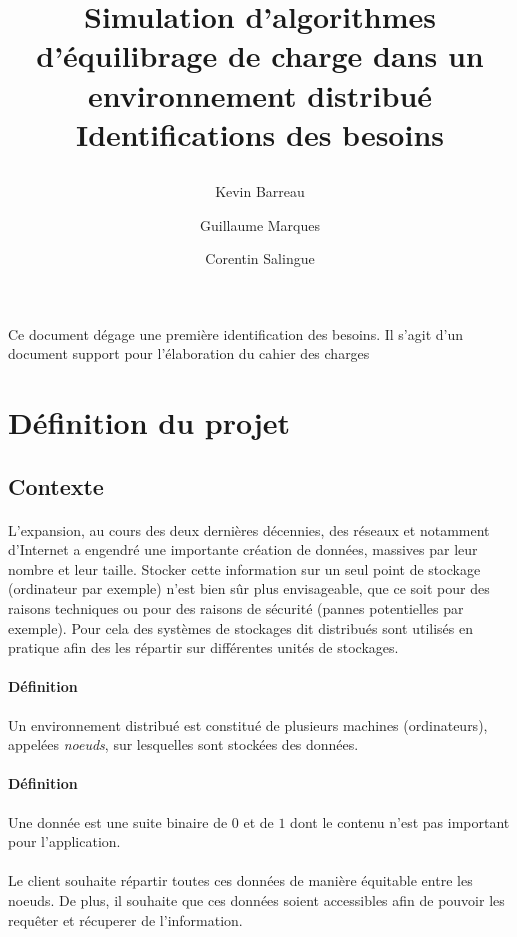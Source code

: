 \documentclass[12pt]{article}
\title{
 \begin{minipage}\linewidth
        \centering
        Simulation d'algorithmes d'équilibrage de charge dans un environnement distribué 
        \vskip3pt
        \large Identifications des besoins
    \end{minipage}
 }
\author{Kevin Barreau \and Guillaume Marques \and Corentin Salingue}
\begin{document}
\maketitle

\abstract
Ce document dégage une première identification des besoins.
Il s'agit d'un document support pour l'élaboration du cahier des charges

\newpage

\renewcommand{\contentsname}{Sommaire} 

\tableofcontents

\newpage

\section{Définition du projet}

\subsection{Contexte}

\paragraph{}
L'expansion, au cours des deux dernières décennies, des réseaux et notamment d'Internet a engendré une importante création de données, massives par leur nombre et leur taille.
Stocker cette information sur un seul point de stockage (ordinateur par exemple) n'est bien sûr plus envisageable, que ce soit pour des raisons  techniques ou pour des raisons de sécurité (pannes potentielles par exemple).
Pour cela des systèmes de stockages dit distribués sont utilisés en pratique afin des les répartir sur différentes unités de stockages.

\paragraph{Définition} Un environnement distribué est constitué de plusieurs machines (ordinateurs), appelées \textit{noeuds}, sur lesquelles sont stockées des données.

\paragraph{Définition} Une donnée est une suite binaire de $0$ et de $1$ dont le contenu n'est pas important pour l'application.

\paragraph{} Le client souhaite répartir toutes ces données de manière équitable entre les noeuds. De plus, il souhaite que ces données soient accessibles afin de pouvoir les requêter et récuperer de l'information.
\end{document}
